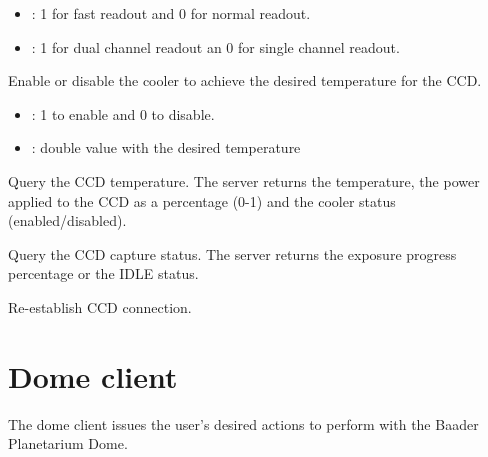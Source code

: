 \documentclass[a4paper,english]{article}
\begin{document}
\begin{Description}
\begin{itemize}
		\item {}: 1 for fast readout and 0 for normal readout.
		\item {}: 1 for dual channel readout an 0 for single channel readout.
	\end{itemize}
	
\item[\Arg{settemp}] Enable or disable the cooler to achieve the desired temperature for the CCD. 

	      
	
	\begin{itemize}
		\item {}: 1 to enable and 0 to disable.
		\item {}: double value with the desired temperature
	\end{itemize}
	
\item[\Arg{gettemp}] Query the CCD temperature. The server returns the temperature, the power applied to the CCD as a percentage (0-1) and the cooler status (enabled/disabled).

	   
	
\item[\Arg{getcapstatus}] Query the CCD capture status. The server returns the exposure progress percentage or the IDLE status.

	   
	
\item[\Arg{reconnect}] Re-establish CCD connection.

	   
	
\end{Description}


\section{Dome client}

The dome client issues the user's desired actions to perform with the Baader Planetarium Dome. \\

   \\
\end{document}
